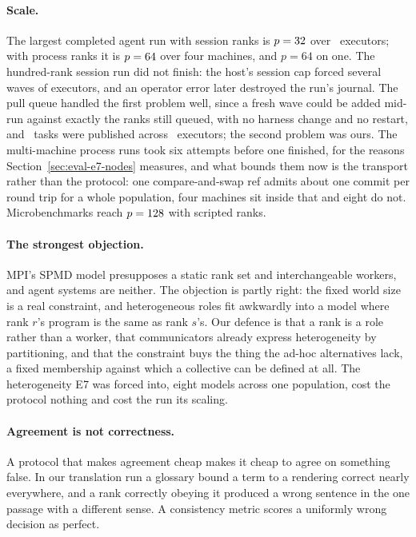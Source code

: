 \documentclass[sigconf,nonacm]{acmart}
\begin{document}
\paragraph{Scale.} The largest completed agent run with session ranks is
$p=32$ over \eLargeExecutors\ executors; with process ranks it is
$p=64$ over four machines, and $p=64$ on one. The hundred-rank
session run did not finish: the host's session cap forced several waves of
executors, and an operator error later destroyed the run's journal. The pull
queue handled the first problem well, since a fresh wave could be added mid-run
against exactly the ranks still queued, with no harness change and no restart,
and \provTasks\ tasks were published across \provExecutors\ executors; the
second problem was ours. The multi-machine process runs took six attempts before
one finished, for the reasons Section~\ref{sec:eval-e7-nodes} measures, and what
bounds them now is the transport rather than the protocol: one compare-and-swap
ref admits about one commit per round trip for a whole population, four machines
sit inside that and eight do not. Microbenchmarks reach $p=128$ with scripted
ranks.

\paragraph{The strongest objection.} MPI's SPMD model presupposes a static rank
set and interchangeable workers, and agent systems are neither. The objection is
partly right: the fixed world size is a real constraint, and heterogeneous roles
fit awkwardly into a model where rank $r$'s program is the same as rank $s$'s.
Our defence is that a rank is a role rather than a worker, that communicators
already express heterogeneity by partitioning, and that the constraint buys the
thing the ad-hoc alternatives lack, a fixed membership against which a
collective can be defined at all. The heterogeneity E7 was forced into, eight
models across one population, cost the protocol nothing and cost the run its
scaling.

\paragraph{Agreement is not correctness.} A protocol that makes agreement cheap
makes it cheap to agree on something false. In our translation run a glossary
bound a term to a rendering correct nearly everywhere, and a rank correctly
obeying it produced a wrong sentence in the one passage with a different sense.
A consistency metric scores a uniformly wrong decision as perfect.
\end{document}
